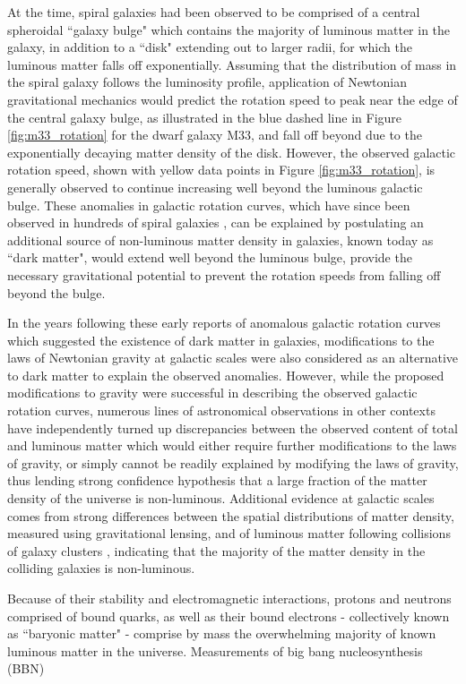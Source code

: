 At the time, spiral galaxies had been observed to be comprised of a central spheroidal ``galaxy bulge" which contains the majority of luminous matter in the galaxy, in addition to a ``disk" extending out to larger radii, for which the luminous matter falls off exponentially. Assuming that the distribution of mass in the spiral galaxy follows the luminosity profile, application of Newtonian gravitational mechanics would predict the rotation speed to peak near the edge of the central galaxy bulge, as illustrated in the blue dashed line in Figure \ref{fig:m33_rotation} for the dwarf galaxy M33, and fall off beyond due to the exponentially decaying matter density of the disk. However, the observed galactic rotation speed, shown with yellow data points in Figure \ref{fig:m33_rotation}, is generally observed to continue increasing well beyond the luminous galactic bulge. These anomalies in galactic rotation curves, which have since been observed in hundreds of spiral galaxies \cite{rotn_curves_1995}, can be explained by postulating an additional source of non-luminous matter density in galaxies, known today as ``dark matter", would extend well beyond the luminous bulge, provide the necessary gravitational potential to prevent the rotation speeds from falling off beyond the bulge.

In the years following these early reports of anomalous galactic rotation curves which suggested the existence of dark matter in galaxies, modifications to the laws of Newtonian gravity at galactic scales \cite{mond_1983} were also considered as an alternative to dark matter to explain the observed anomalies. However, while the proposed modifications to gravity were successful in describing the observed galactic rotation curves, numerous lines of astronomical observations in other contexts have independently turned up discrepancies between the observed content of total and luminous matter which would either require further modifications to the laws of gravity, or simply cannot be readily explained by modifying the laws of gravity, thus lending strong confidence hypothesis that a large fraction of the matter density of the universe is non-luminous. Additional evidence at galactic scales comes from strong differences between the spatial distributions of matter density, measured using gravitational lensing, and of luminous matter following collisions of galaxy clusters \cite{bullet_1995}, indicating that the majority of the matter density in the colliding galaxies is non-luminous. 

Because of their stability and electromagnetic interactions, protons and neutrons comprised of bound quarks, as well as their bound electrons - collectively known as ``baryonic matter" - comprise by mass the overwhelming majority of known luminous matter in the universe. Measurements of big bang nucleosynthesis (BBN) 


